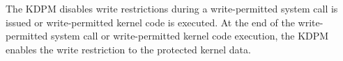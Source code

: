 The KDPM disables write restrictions during a write-permitted system
call is issued or write-permitted kernel code is executed.
%
At the end of the write-permitted system call or write-permitted kernel code
execution, the KDPM enables the write restriction to the protected kernel data.













